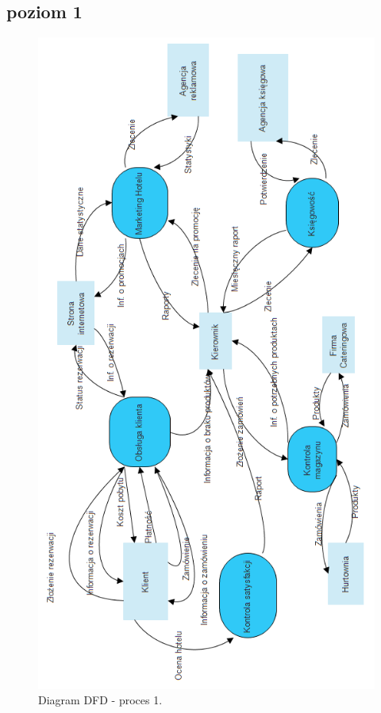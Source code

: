 \documentclass[a4paper, 11pt]{article}
\begin{document}
	
	\subsection{poziom 1}
	\indent
	\begin{figure}[H]%
			\center
			\includegraphics[scale=0.7]{Img/DFDpoziom0.png}
			\caption{Diagram DFD - proces 1.}
	\end{figure}	
\end{document}
